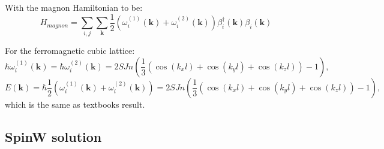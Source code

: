 \documentclass[a4paper,12pt]{article}
\begin{document}
            With the magnon Hamiltonian to be:
            \begin{equation}
                H_{magnon} = \sum_{i,j}\sum_{\boldsymbol{k}}\dfrac{1}{2}(\omega_i^{(1)}(\boldsymbol{k}) + \omega_i^{(2)}(\boldsymbol{k}))
                \beta^{\dag}_i(\boldsymbol{k})\beta_i(\boldsymbol{k})
            \end{equation}

            For the ferromagnetic cubic lattice:
            \begin{equation}
                \hbar \omega_i^{(1)}(\boldsymbol{k}) =
                \hbar \omega_i^{(2)}(\boldsymbol{k}) = 
                2SJn\left(\dfrac{1}{3}\left(\cos(k_xl) + \cos(k_yl) + \cos(k_zl)\right) - 1\right),
            \end{equation}
            \begin{equation}
                E(\boldsymbol{k}) = 
                \hbar \dfrac{1}{2}(\omega_i^{(1)}(\boldsymbol{k}) +
                \omega_i^{(2)}(\boldsymbol{k})) = 
                2SJn\left(\dfrac{1}{3}\left(\cos(k_xl) + \cos(k_yl) + \cos(k_zl)\right) - 1\right),
            \end{equation}
            which is the same as textbooks result.
        \subsection{SpinW solution}\label{sec:spinw}
    
\end{document}
